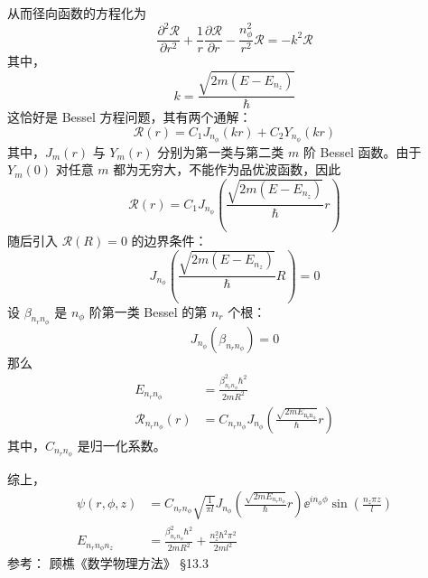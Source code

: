 从而径向函数的方程化为
\begin{equation}
\frac{\partial^2 \mathcal{R}}{\partial r^2} + \frac{1}{r} \frac{\partial \mathcal{R}}{\partial r} - \frac{n_\phi^2}{r^2} \mathcal{R} = - k^2 \mathcal{R}
\end{equation}
其中，
\begin{equation}
k = \frac{\sqrt{2 m (E - E_{n_z})}}{\hbar}
\end{equation}
这恰好是 Bessel 方程问题，其有两个通解：
\begin{equation}
\mathcal{R}(r) = C_1 J_{n_\phi} (k r) + C_2 Y_{n_\phi} (k r)
\end{equation}
其中，$J_m (r)$ 与 $Y_m (r)$ 分别为第一类与第二类 $m$ 阶 Bessel 函数。由于 $Y_m (0)$ 对任意 $m$ 都为无穷大，不能作为品优波函数，因此
\begin{equation}
\mathcal{R}(r) = C_1 J_{n_\phi} \left( \frac{\sqrt{2 m (E - E_{n_z})}}{\hbar} r \right)
\end{equation}
随后引入 $\mathcal{R}(R) = 0$ 的边界条件：
\begin{equation}
J_{n_\phi} \left( \frac{\sqrt{2 m (E - E_{n_z})}}{\hbar} R \right) = 0
\end{equation}
设 $\beta_{n_r n_\phi}$ 是 $n_\phi$ 阶第一类 Bessel 的第 $n_r$ 个根：
\begin{equation}
J_{n_\phi} (\beta_{n_r n_\phi}) = 0
\end{equation}
那么
\begin{align}
E_{n_r n_\phi} &= \frac{\beta_{n_r n_\phi}^2 \hbar^2}{2 m R^2} \\
\mathcal{R}_{n_r n_\phi} (r) &= C_{n_r n_\phi} J_{n_\phi} \left( \frac{\sqrt{2 m E_\mathrm{n_r n_\phi}}}{\hbar} r \right)
\end{align}
其中，$C_{n_r n_\phi}$ 是归一化系数。

综上，
\begin{align}
\psi(r, \phi, z) &= C_{n_r n_\phi} \sqrt{\frac{1}{\pi l}} J_{n_\phi} \left( \frac{\sqrt{2 m E_{n_r n_\phi}}}{\hbar} r \right) \ee^{i n_\phi \phi} \sin \left( \frac{n_z \pi z}{l} \right) \\
E_{n_r n_\phi n_z} &= \frac{\beta_{n_r n_\phi}^2 \hbar^2}{2 m R^2} + \frac{n_z^2 \hbar^2 \pi^2}{2 m l^2}
\end{align}
参考：
顾樵《数学物理方法》 \S 13.3
